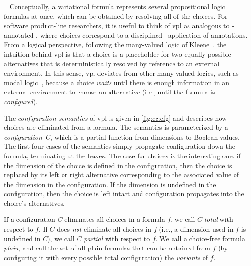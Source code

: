 ~\label{section:vpl:semantics}
%
Conceptually, a variational formula represents several propositional logic
formulas at once, which can be obtained by resolving all of the choices. For
software product-line researchers, it is useful to think of \ac{vpl} as analogous
to -annotated \pl{}, where choices correspond to a
disciplined~\cite{LKA:AOSD11} application of  annotations.
%
From a logical perspective, following the many-valued logic of
Kleene~\cite{kleene1968introduction,Rescher1969-RESML}, the intuition behind
\ac{vpl} is that a choice is a placeholder for two equally possible alternatives
that is deterministically resolved by reference to an external environment.
%
In this sense, \ac{vpl} deviates from other many-valued logics, such as modal
logic~\cite{sep-logic-modal}, because a choice \emph{waits} until there is
enough information in an external environment to choose an alternative (i.e.,
until the formula is \emph{configured}).

The \emph{configuration semantics} of \ac{vpl} is given in
\autoref{fig:cc:cfg} and describes how choices are eliminated from a
formula. The semantics is parameterized by a \emph{configuration}\ $C$, which is
a partial function from dimensions to Boolean values.
%
The first four cases of the semantics simply propagate configuration down the
formula, terminating at the leaves. The case for choices is the interesting one:
if the dimension of the choice is defined in the configuration, then the choice
is replaced by its left or right alternative corresponding to the associated
value of the dimension in the configuration. If the dimension is undefined in
the configuration, then the choice is left intact and configuration propagates
into the choice's alternatives.

If a configuration $C$ eliminates all choices in a formula $f$, we call $C$
\emph{total} with respect to $f$. If $C$ does \emph{not} eliminate all choices
in $f$ (i.e., a dimension used in $f$ is undefined in $C$), we call $C$
\emph{partial} with respect to $f$.
%
We call a choice-free formula \emph{plain}, and call the set of all plain
formulas that can be obtained from $f$ (by configuring it with every possible
total configuration) the \emph{variants} of $f$.


